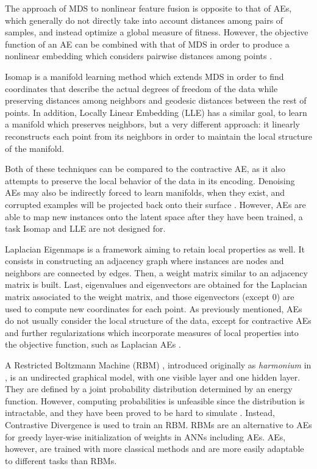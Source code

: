 \documentclass[preprint,5p,compress]{elsarticle}
\begin{document}
The approach of MDS to nonlinear feature fusion is opposite to that of AEs, which generally do not directly take into account distances among pairs of samples, and instead optimize a global measure of fitness. However, the objective function of an AE can be combined with that of MDS in order to produce a nonlinear embedding which considers pairwise distances among points \cite{EmbeddingAEReg}.

Isomap \cite{Isomap} is a manifold learning method which extends MDS in order to find coordinates that describe the actual degrees of freedom of the data while preserving distances among neighbors and geodesic distances between the rest of points. In addition, Locally Linear Embedding (LLE) \cite{LLE} has a similar goal, to learn a manifold which preserves neighbors, but a very different approach: it linearly reconstructs each point from its neighbors in order to maintain the local structure of the manifold.

Both of these techniques can be compared to the contractive AE, as it also attempts to preserve the local behavior of the data in its encoding. Denoising AEs may also be indirectly forced to learn manifolds, when they exist, and corrupted examples will be projected back onto their surface \cite{vincent2010stacked}. However, AEs are able to map new instances onto the latent space after they have been trained, a task Isomap and LLE are not designed for.

Laplacian Eigenmaps \cite{LaplacianEigenmaps} is a framework aiming to retain local properties as well. It consists in constructing an adjacency graph where instances are nodes and neighbors are connected by edges. Then, a weight matrix similar to an adjacency matrix is built. Last, eigenvalues and eigenvectors are obtained for the Laplacian matrix associated to the weight matrix, and those eigenvectors (except 0) are used to compute new coordinates for each point. As previously mentioned, AEs do not usually consider the local structure of the data, except for contractive AEs and further regularizations which incorporate measures of local properties into the objective function, such as Laplacian AEs \cite{LaplacianAE}.

A Restricted Boltzmann Machine (RBM) \cite{DLBookRBM}, introduced originally as \textit{harmonium} in \cite{Harmonium}, is an undirected graphical model, with one visible layer and one hidden layer. They are defined by a joint probability distribution determined by an energy function.
However, computing probabilities is unfeasible since the distribution is intractable, and they have been proved to be hard to simulate \cite{RBMHard}. Instead, Contrastive Divergence \cite{ContrastiveDivergence} is used to train an RBM. RBMs are an alternative to AEs for greedy layer-wise initialization of weights in ANNs including AEs. AEs, however, are trained with more classical methods and are more easily adaptable to different tasks than RBMs.
\end{document}
